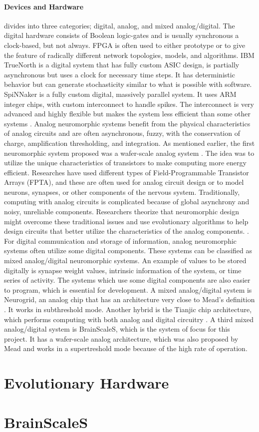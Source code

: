 \paragraph{Devices and Hardware} divides into three categories; digital, analog, and mixed analog/digital.
The digital hardware consists of Boolean logic-gates and is usually synchronous a clock-based, but not always.
FPGA is often used to either prototype or to give the feature of radically different network topologies, models, and algorithms.
IBM TrueNorth is a digital system that has fully custom ASIC design, is partially asynchronous but uses a clock for necessary time steps.
It has deterministic behavior but can generate stochasticity similar to what is possible with software.
SpiNNaker is a fully custom digital, massively parallel system.
It uses ARM integer chips, with custom interconnect to handle spikes.
The interconnect is very advanced and highly flexible but makes the system less efficient than some other systems \cite{furber_large-scale_2016} \cite{schuman_survey_2017}.
Analog neuromorphic systems benefit from the physical characteristics of analog circuits and are often asynchronous, fuzzy, with the conservation of charge, amplification thresholding, and integration.
As mentioned earlier, the first neuromorphic system proposed was a wafer-scale analog system \cite{mead_neuromorphic_1990}.
The idea was to utilize the unique characteristics of transistors to make computing more energy efficient.
Researches have used different types of Field-Programmable Transistor Arrays (FPTA), and these are often used for analog circuit design or to model neurons, synapses, or other components of the nervous system.
Traditionally, computing with analog circuits is complicated because of global asynchrony and noisy, unreliable components. Researchers theorize that neuromorphic design might overcome these traditional issues and use evolutionary algorithms to help design circuits that better utilize the characteristics of the analog components. \cite{langeheine_cmos_2001}.
For digital communication and storage of information, analog neuromorphic systems often utilize some digital components. These systems can be classified as mixed analog/digital neuromorphic systems.
An example of values to be stored digitally is synapse weight values, intrinsic information of the system, or time series of activity. The systems which use some digital components are also easier to program, which is essential for development.
A mixed analog/digital system is Neurogrid, an analog chip that has an architecture very close to Mead's definition \cite{mead_neuromorphic_1990}.
It works in subthreshold mode.
Another hybrid is the Tianjic chip architecture, which performs computing with both analog and digital circuitry \cite{pei_towards_2019}.
A third mixed analog/digital system is BrainScaleS, which is the system of focus for this project.
It has a wafer-scale analog architecture, which was also proposed by Mead \cite{mead_neuromorphic_1990} and works in a supertreshold mode because of the high rate of operation.
\cite{schuman_survey_2017}

\section{Evolutionary Hardware}\label{sect:eh}


\section{BrainScaleS}\label{sect:bss}

